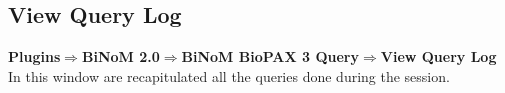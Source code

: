 \subsection{View Query Log}
\textbf{Plugins$\Rightarrow$BiNoM 2.0$\Rightarrow$BiNoM BioPAX 3 Query$\Rightarrow$View Query Log}\\
In this window are recapitulated all the queries done during the session.

